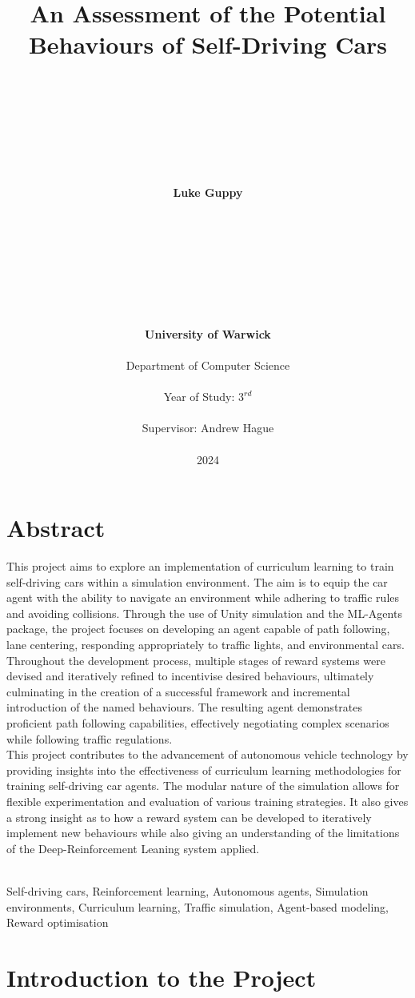 \documentclass{article}
\title{\LARGE\bfseries An Assessment of the Potential Behaviours of Self-Driving Cars}
\author{
     \\
     \\
     \\
     \\
     \\
     \\
     \\
\textbf{Luke Guppy} \\
    \\
    \\
    \\
    \\
    \\
    \\
    \\
    \\
\textbf{University of Warwick} \\
\\
Department of Computer Science \\
\\
Year of Study: $3^{rd}$ \\
\\
Supervisor: Andrew Hague \\
\\
2024 }
\date{}
\begin{document}
\maketitle

\newpage

\section*{Abstract}
This project aims to explore an implementation of curriculum learning to train self-driving cars within a simulation environment. The aim is to equip the car agent with the ability to navigate an environment while adhering to traffic rules and avoiding collisions. Through the use of Unity simulation and the ML-Agents package, the project focuses on developing an agent capable of path following, lane centering, responding appropriately to traffic lights, and environmental cars.\\

Throughout the development process, multiple stages of reward systems were devised and iteratively refined to incentivise desired behaviours, ultimately culminating in the creation of a successful framework and incremental introduction of the named behaviours. The resulting agent demonstrates proficient path following capabilities, effectively negotiating complex scenarios while following traffic regulations.\\

This project contributes to the advancement of autonomous vehicle technology by providing insights into the effectiveness of curriculum learning methodologies for training self-driving car agents. The modular nature of the simulation allows for flexible experimentation and evaluation of various training strategies. It also gives a strong insight as to how a reward system can be developed to iteratively implement new behaviours while also giving an understanding of the limitations of the Deep-Reinforcement Leaning system applied.

\noindent\hrulefill \\

Self-driving cars, Reinforcement learning, Autonomous agents, Simulation environments, Curriculum learning, Traffic simulation, Agent-based modeling, Reward optimisation

\newpage

\tableofcontents
\newpage

\section{Introduction to the Project}
\end{document}
